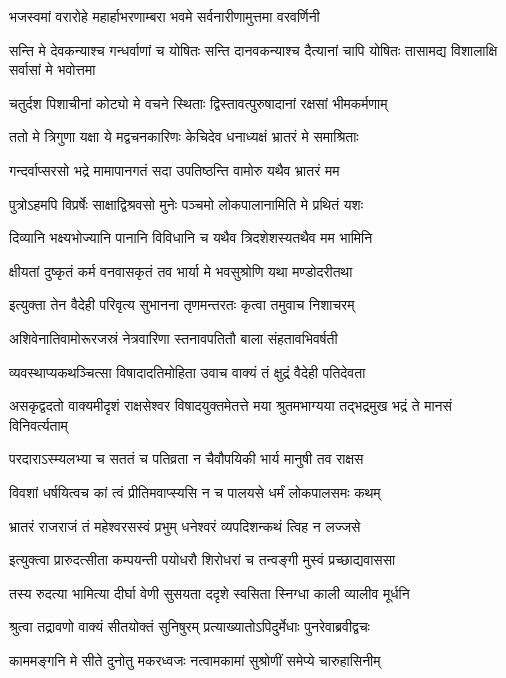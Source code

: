 \twolineshloka
{भजस्वमां वरारोहे महार्हाभरणाम्बरा}
{भवमे सर्वनारीणामुत्तमा वरवर्णिनी}


\threelineshloka
{सन्ति मे देवकन्याश्च गन्धर्वाणां च योषितः}
{सन्ति दानवकन्याश्च दैत्यानां चापि योषितः}
{तासामद्य विशालाक्षि सर्वासां मे भवोत्तमा}


\twolineshloka
{चतुर्दश पिशाचीनां कोट्यो मे वचने स्थिताः}
{द्विस्तावत्पुरुषादानां रक्षसां भीमकर्मणाम्}


\twolineshloka
{ततो मे त्रिगुणा यक्षा ये मद्वचनकारिणः}
{केचिदेव धनाध्यक्षं भ्रातरं मे समाश्रिताः}


\twolineshloka
{गन्दर्वाप्सरसो भद्रे मामापानगतं सदा}
{उपतिष्ठन्ति वामोरु यथैव भ्रातरं मम}


\twolineshloka
{पुत्रोऽहमपि विप्रर्षेः साक्षाद्विश्रवसो मुनेः}
{पञ्चमो लोकपालानामिति मे प्रथितं यशः}


\twolineshloka
{दिव्यानि भक्ष्यभोज्यानि पानानि विविधानि च}
{यथैव त्रिदशेशस्यतथैव मम भामिनि}


\twolineshloka
{क्षीयतां दुष्कृतं कर्म वनवासकृतं तव}
{भार्या मे भवसुश्रोणि यथा मण्डोदरीतथा}


\twolineshloka
{इत्युक्ता तेन वैदेही परिवृत्य सुभानना}
{तृणमन्तरतः कृत्वा तमुवाच निशाचरम्}


\twolineshloka
{अशिवेनातिवामोरूरजस्रं नेत्रवारिणा}
{स्तनावपतितौ बाला संहतावभिवर्षती}


\twolineshloka
{व्यवस्थाप्यकथञ्चित्सा विषादादतिमोहिता}
{उवाच वाक्यं तं क्षुद्रं वैदेही पतिदेवता}


\threelineshloka
{असकृद्वदतो वाक्यमीदृशं राक्षसेश्वर}
{विषादयुक्तमेतत्ते मया श्रुतमभाग्यया}
{तद्भद्रमुख भद्रं ते मानसं विनिवर्त्यताम्}


\twolineshloka
{परदाराऽस्म्यलभ्या च सततं च पतिव्रता}
{न चैवौपयिकी भार्य मानुषी तव राक्षस}


\twolineshloka
{विवशां धर्षयित्वच कां त्वं प्रीतिमवाप्स्यसि}
{न च पालयसे धर्मं लोकपालसमः कथम्}


\twolineshloka
{भ्रातरं राजराजं तं महेश्वरसस्वं प्रभुम्}
{धनेश्वरं व्यपदिशन्कथं त्विह न लज्जसे}


\twolineshloka
{इत्युक्त्वा प्रारुदत्सीता कम्पयन्ती पयोधरौ}
{शिरोधरां च तन्वङ्गी मुस्वं प्रच्छाद्यवाससा}


\twolineshloka
{तस्य रुदत्या भामित्या दीर्घा वेणी सुसयता}
{ददृशे स्वसिता स्निग्धा काली व्यालीव मूर्धनि}


\twolineshloka
{श्रुत्वा तद्रावणो वाक्यं सीतयोक्तं सुनिषुरम्}
{प्रत्याख्यातोऽपिदुर्मेधाः पुनरेवाब्रवीद्वचः}


\twolineshloka
{काममङ्गनि मे सीते दुनोतु मकरध्वजः}
{नत्वामकामां सुश्रोणीं समेप्ये चारुहासिनीम्}


